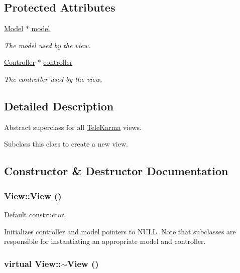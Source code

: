 \subsection*{Protected Attributes}
\begin{CompactItemize}
\item 
\hyperlink{classModel}{Model} $\ast$ \hyperlink{classView_f9f5eea17223c374879af02bd02dfdfb}{model}
\begin{CompactList}\small\item\em The model used by the view. \item\end{CompactList}\item 
\hyperlink{classController}{Controller} $\ast$ \hyperlink{classView_e097997e36de3c065f600e768e62c249}{controller}
\begin{CompactList}\small\item\em The controller used by the view. \item\end{CompactList}\end{CompactItemize}


\subsection{Detailed Description}
Abstract superclass for all \hyperlink{classTeleKarma}{TeleKarma} views. 

Subclass this class to create a new view. 

\subsection{Constructor \& Destructor Documentation}
\hypertarget{classView_44ad60a768422d3fa8fbd7576950080a}{
\subsubsection[{View}]{\setlength{\rightskip}{0pt plus 5cm}View::View ()}}
\label{classView_44ad60a768422d3fa8fbd7576950080a}


Default constructor. 

Initializes controller and model pointers to NULL. Note that subclasses are responsible for instantiating an appropriate model and controller. \hypertarget{classView_a02a820358e1a7bf7e34d205212ae8f3}{
\subsubsection[{$\sim$View}]{\setlength{\rightskip}{0pt plus 5cm}virtual View::$\sim$View ()}}
\label{classView_a02a820358e1a7bf7e34d205212ae8f3}


